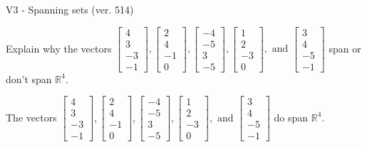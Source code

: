 \begin{exercise}
  \begin{exerciseTitle}V3 - Spanning sets (ver. 514)\end{exerciseTitle}
  \begin{exerciseStatement}
    Explain why the vectors \(\left[\begin{array}{r}
4 \\
3 \\
-3 \\
-1
\end{array}\right] , \left[\begin{array}{r}
2 \\
4 \\
-1 \\
0
\end{array}\right] , \left[\begin{array}{r}
-4 \\
-5 \\
3 \\
-5
\end{array}\right] , \left[\begin{array}{r}
1 \\
2 \\
-3 \\
0
\end{array}\right] , \text{ and } \left[\begin{array}{r}
3 \\
4 \\
-5 \\
-1
\end{array}\right]\) span or don't span \(\mathbb{R}^4\). 
	


  \end{exerciseStatement}
  \begin{exerciseAnswer}
   The vectors \(\left[\begin{array}{r}
4 \\
3 \\
-3 \\
-1
\end{array}\right] , \left[\begin{array}{r}
2 \\
4 \\
-1 \\
0
\end{array}\right] , \left[\begin{array}{r}
-4 \\
-5 \\
3 \\
-5
\end{array}\right] , \left[\begin{array}{r}
1 \\
2 \\
-3 \\
0
\end{array}\right] , \text{ and } \left[\begin{array}{r}
3 \\
4 \\
-5 \\
-1
\end{array}\right]\) 
  	 do  
	span \(\mathbb{R}^4\).
  



\end{exerciseAnswer}
\end{exercise}
